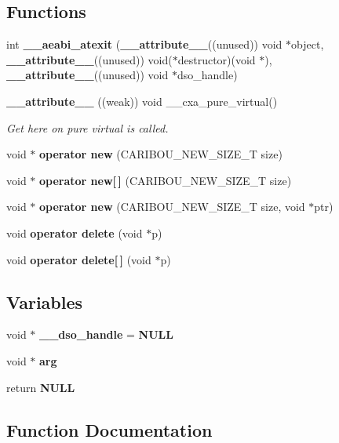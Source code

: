 \subsection*{Functions}
\begin{DoxyCompactItemize}
\item 
int {\bf \+\_\+\+\_\+aeabi\+\_\+atexit} ({\bf \+\_\+\+\_\+attribute\+\_\+\+\_\+}((unused)) void $\ast$object, {\bf \+\_\+\+\_\+attribute\+\_\+\+\_\+}((unused)) void($\ast$destructor)(void $\ast$), {\bf \+\_\+\+\_\+attribute\+\_\+\+\_\+}((unused)) void $\ast$dso\+\_\+handle)
\item 
{\bf \+\_\+\+\_\+attribute\+\_\+\+\_\+} ((weak)) void \+\_\+\+\_\+cxa\+\_\+pure\+\_\+virtual()
\begin{DoxyCompactList}\small\item\em Get here on pure virtual is called. \end{DoxyCompactList}\item 
void $\ast$ {\bf operator new} (C\+A\+R\+I\+B\+O\+U\+\_\+\+N\+E\+W\+\_\+\+S\+I\+Z\+E\+\_\+T size)
\item 
void $\ast$ {\bf operator new[$\,$]} (C\+A\+R\+I\+B\+O\+U\+\_\+\+N\+E\+W\+\_\+\+S\+I\+Z\+E\+\_\+T size)
\item 
void $\ast$ {\bf operator new} (C\+A\+R\+I\+B\+O\+U\+\_\+\+N\+E\+W\+\_\+\+S\+I\+Z\+E\+\_\+T size, void $\ast$ptr)
\item 
void {\bf operator delete} (void $\ast$p)
\item 
void {\bf operator delete[$\,$]} (void $\ast$p)
\end{DoxyCompactItemize}
\subsection*{Variables}
\begin{DoxyCompactItemize}
\item 
void $\ast$ {\bf \+\_\+\+\_\+dso\+\_\+handle} = {\bf N\+U\+LL}
\item 
void $\ast$ {\bf arg}
\item 
return {\bf N\+U\+LL}
\end{DoxyCompactItemize}


\subsection{Function Documentation}
